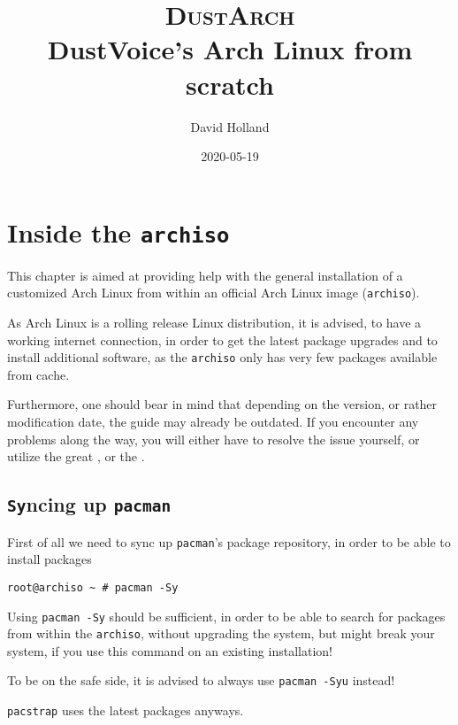 \documentclass[10pt]{dustdoc}
\title{\texorpdfstring{{\scshape\huge DustArch\\\vspace{\parskip}}}{DustArch: }DustVoice’s Arch Linux from scratch}
\author{David Holland}
\date{2020-05-19}
\begin{document}
\maketitle

\tableofcontents

\chapter{Inside the \texttt{archiso}}
\label{sec:inside-the-archiso}

This chapter is aimed at providing help with the general installation of a customized Arch Linux from within an official Arch Linux image (\texttt{archiso}).

\begin{NOTE}
    As Arch Linux is a rolling release Linux distribution, it is advised, to have a working internet connection, in order to get the latest package upgrades and to install additional software, as the \texttt{archiso} only has very few packages available from cache.

    Furthermore, one should bear in mind that depending on the version, or rather modification date, the guide may already be outdated.
    If you encounter any problems along the way, you will either have to resolve the issue yourself, or utilize the great , or the .
\end{NOTE}

\section{\texttt{Sy}ncing up \texttt{pacman}}
\label{sec:syncing-up-pacman}

First of all we need to sync up \texttt{pacman}'s package repository, in order to be able to install packages

\begin{verbatim}
root@archiso ~ # pacman -Sy
\end{verbatim}

\begin{WARNING}
    Using \texttt{pacman -Sy} should be sufficient, in order to be able to search for packages from within the \texttt{archiso}, without upgrading the system, but might break your system, if you use this command on an existing installation!

    To be on the safe side, it is advised to always use \texttt{pacman -Syu} instead!

    \texttt{pacstrap} uses the latest packages anyways.
\end{WARNING}
\end{document}
